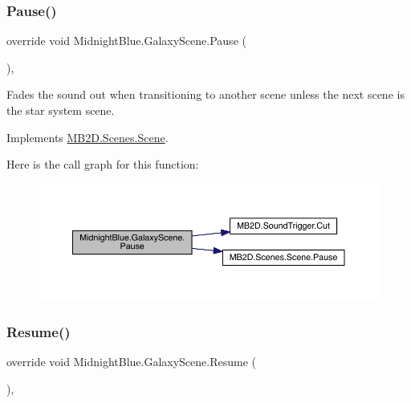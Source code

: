 \subsubsection{\texorpdfstring{Pause()}{Pause()}}
{\footnotesize\ttfamily override void Midnight\+Blue.\+Galaxy\+Scene.\+Pause (\begin{DoxyParamCaption}{ }\end{DoxyParamCaption})\hspace{0.3cm}{\ttfamily [inline]}, {\ttfamily [virtual]}}



Fades the sound out when transitioning to another scene unless the next scene is the star system scene. 



Implements \hyperlink{class_m_b2_d_1_1_scenes_1_1_scene_a0661eff0223150fa8e9ea88145409e5d}{M\+B2\+D.\+Scenes.\+Scene}.

Here is the call graph for this function\+:\nopagebreak
\begin{figure}[H]
\begin{center}
\leavevmode
\includegraphics[width=350pt]{class_midnight_blue_1_1_galaxy_scene_aeb44afaeda2cccd225e64908bb76bee4_cgraph}
\end{center}
\end{figure}
\hypertarget{class_midnight_blue_1_1_galaxy_scene_ab641e6727cdb64dc6487e9a229521692}{}\label{class_midnight_blue_1_1_galaxy_scene_ab641e6727cdb64dc6487e9a229521692} 
\subsubsection{\texorpdfstring{Resume()}{Resume()}}
{\footnotesize\ttfamily override void Midnight\+Blue.\+Galaxy\+Scene.\+Resume (\begin{DoxyParamCaption}{ }\end{DoxyParamCaption})\hspace{0.3cm}{\ttfamily [inline]}, {\ttfamily [virtual]}}



